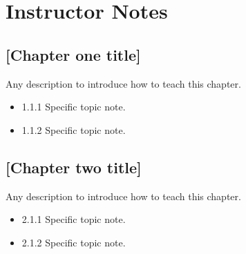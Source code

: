 \documentclass[../workbook]{subfiles}
\begin{document}

\section*{Instructor Notes}



\subsection*{[Chapter one title]}

\par{
    Any description to introduce how to teach this chapter.
}

\begin{itemize}
    \item 1.1.1 Specific topic note.
    \item 1.1.2 Specific topic note.
\end{itemize}



\subsection*{[Chapter two title]}

\par{
    Any description to introduce how to teach this chapter.
}

\begin{itemize}
    \item 2.1.1 Specific topic note.
    \item 2.1.2 Specific topic note.
\end{itemize}
\end{document}
